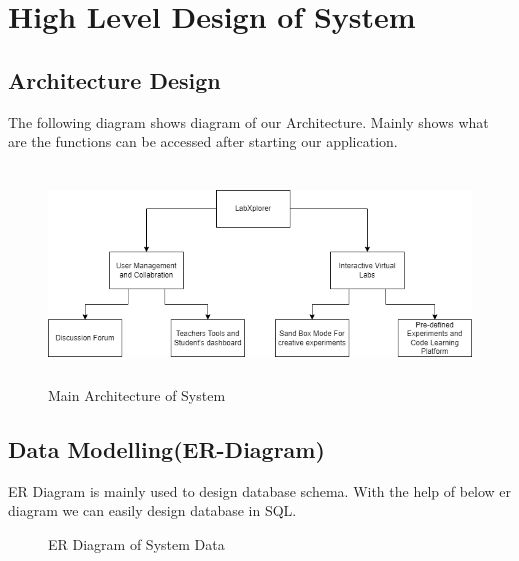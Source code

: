 \section{High Level Design of System}
\subsection{Architecture Design}
The following diagram shows diagram of our Architecture. Mainly shows what are the functions can be accessed after starting our application.
\begin{figure}[H]
    \includegraphics[height = 5.7cm]{Diagrams/Main_Block.png}
    \caption{Main Architecture of System}
\end{figure}
\newpage
\subsection{Data Modelling(ER-Diagram)}
ER Diagram is mainly used to design database schema. With the help of below er diagram we can easily design database in SQL.
\begin{figure}[H]
    \caption{ER Diagram of System Data}
\end{figure}
\newpage
